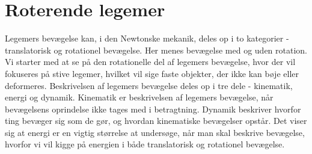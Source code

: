 \section{Roterende legemer}
Legemers bevægelse kan, i den Newtonske mekanik, deles op i to kategorier - translatorisk og rotationel bevægelse. Her menes bevægelse med og uden rotation. Vi starter med at se på den rotationelle del af legemers bevægelse, hvor der vil fokuseres på stive legemer, hvilket vil sige faste objekter, der ikke kan bøje eller deformeres. Beskrivelsen af legemers bevægelse deles op i tre dele - kinematik, energi og dynamik. Kinematik er beskrivelsen af legemers bevægelse, når bevægelsens oprindelse ikke tages med i betragtning. Dynamik beskriver hvorfor ting bevæger sig som de gør, og hvordan kinematiske bevægelser opstår. Det viser sig at energi er en vigtig størrelse at undersøge, når man skal beskrive bevægelse, hvorfor vi vil kigge på energien i både translatorisk og rotationel bevægelse.

